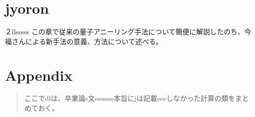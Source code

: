 \documentclass[uplatex,openany,oneside,a4j,11pt]{jsbook}
\begin{document}
\chapter{jyoron}
    ２llsssss
    この章で従来の\cite{nakamura1999coherent}量子アニーリング手法について簡便に解説したのち、今福さんによる新手法の意義、方法について述べる。\\
    
\chapter{Appendix}
\begin{abstract}
    ここでdlは、卒業論s文sssssss本旨にjは記載eeeしなかった計算の類をまとめておく。

\end{abstract}
\begin{appendix}
    
\end{appendix}
%
\printbibliography[title=参考文献]
\end{document}
